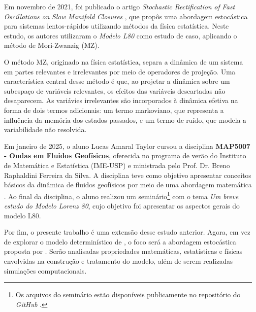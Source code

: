 \documentclass[12pt]{article}
\begin{document}
Em novembro de 2021, foi publicado o artigo \textit{Stochastic Rectification of Fast Oscillations on Slow Manifold Closures} \citep{Chekroun2021}, que propôs uma abordagem estocástica para sistemas lentos-rápidos utilizando métodos da física estatística. Neste estudo, os autores utilizaram o \textit{Modelo L80} como estudo de caso, aplicando o método de Mori-Zwanzig (MZ).

O método MZ, originado na física estatística, separa a dinâmica de um sistema em partes relevantes e irrelevantes por meio de operadores de projeção. Uma característica central desse método é que, ao projetar a dinâmica sobre um subespaço de variáveis relevantes, os efeitos das variáveis descartadas não desaparecem. As variávies irrelevantes são incorporados à dinâmica efetiva na forma de dois termos adicionais: um termo markoviano, que representa a influência da memória dos estados passados, e um termo de ruído, que modela a variabilidade não resolvida.

Em janeiro de 2025, o aluno Lucas Amaral Taylor cursou a disciplina \textbf{MAP5007 - Ondas em Fluidos Geofísicos}, oferecida no programa de verão do Instituto de Matemática e Estatística (IME-USP) e ministrada pelo Prof. Dr. Breno Raphaldini Ferreira da Silva. A disciplina teve como objetivo apresentar conceitos básicos da dinâmica de fluidos geofísicos por meio de uma abordagem matemática \citep{uspJanus}. Ao final da disciplina, o aluno realizou um seminário\footnote{Os arquivos do seminário estão disponíveis publicamente no repositório do \textit{GitHub} \citep{TaylorL80}.} com o tema \textit{Um breve estudo do Modelo Lorenz 80}, cujo objetivo foi apresentar os aspectos gerais do modelo L80.

Por fim, o presente trabalho é uma extensão desse estudo anterior. Agora, em vez de explorar o modelo determinístico de \citet{Lorenz1980}, o foco será a abordagem estocástica proposta por \citet{Chekroun2021}. Serão analisadas propriedades matemáticas, estatísticas e físicas envolvidas na construção e tratamento do modelo, além de serem realizadas simulações computacionais.

    
\end{document}
